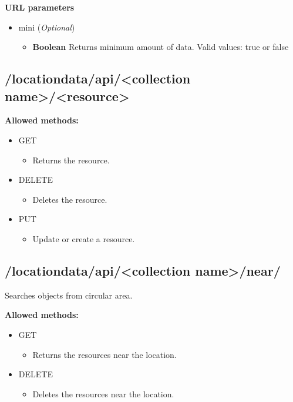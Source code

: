 \documentclass[letterpaper,10pt,english]{sphinxmanual}
\begin{document}
\textbf{URL parameters}
\begin{itemize}
\item {} 
mini (\emph{Optional})
\begin{itemize}
\item {} 
\textbf{Boolean} Returns minimum amount of data. Valid values: true or false

\end{itemize}

\end{itemize}


\subsection{/locationdata/api/\textless{}collection name\textgreater{}/\textless{}resource\textgreater{}}
\label{restdoc:locationdata-api-collection-name-resource}
\textbf{Allowed methods:}
\begin{itemize}
\item {} 
GET
\begin{itemize}
\item {} 
Returns the resource.

\end{itemize}

\item {} 
DELETE
\begin{itemize}
\item {} 
Deletes the resource.

\end{itemize}

\item {} 
PUT
\begin{itemize}
\item {} 
Update or create a resource.

\end{itemize}

\end{itemize}


\subsection{/locationdata/api/\textless{}collection name\textgreater{}/near/}
\label{restdoc:locationdata-api-collection-name-near}
Searches objects from circular area.

\textbf{Allowed methods:}
\begin{itemize}
\item {} 
GET
\begin{itemize}
\item {} 
Returns the resources near the location.

\end{itemize}

\item {} 
DELETE
\begin{itemize}
\item {} 
Deletes the resources near the location.

\end{itemize}

\end{itemize}
\end{document}
